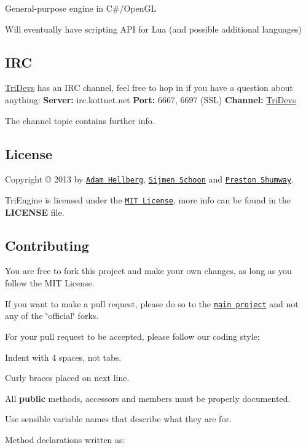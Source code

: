 General-\/purpose engine in C\#/\-Open\-G\-L

Will eventually have scripting A\-P\-I for Lua (and possible additional languages)

\subsection*{I\-R\-C}

\hyperlink{namespace_tri_devs}{Tri\-Devs} has an I\-R\-C channel, feel free to hop in if you have a question about anything\-: {\bfseries Server\-:} irc.\-kottnet.\-net {\bfseries Port\-:} 6667, 6697 (S\-S\-L) {\bfseries Channel\-:} \hyperlink{namespace_tri_devs}{Tri\-Devs}

The channel topic contains further info.

\subsection*{License}

Copyright © 2013 by \href{https://github.com/Sharparam}{\tt Adam Hellberg}, \href{https://github.com/Vijfhoek}{\tt Sijmen Schoon} and \href{https://github.com/anidude}{\tt Preston Shumway}.

Tri\-Engine is licensed under the \href{http://opensource.org/licenses/MIT}{\tt M\-I\-T License}, more info can be found in the {\bfseries L\-I\-C\-E\-N\-S\-E} file.

\subsection*{Contributing}

You are free to fork this project and make your own changes, as long as you follow the M\-I\-T License.

If you want to make a pull request, please do so to the \href{https://github.com/TriDevs/TriEngine}{\tt main project} and not any of the \char`\"{}official\char`\"{} forks.

For your pull request to be accepted, please follow our coding style\-:
\begin{DoxyItemize}
\item Indent with 4 spaces, not tabs.
\item Curly braces placed on next line.
\item All {\bfseries public} methods, accessors and members must be properly documented.
\item Use sensible variable names that describe what they are for.
\item Method declarations written as\-:
\end{DoxyItemize}

